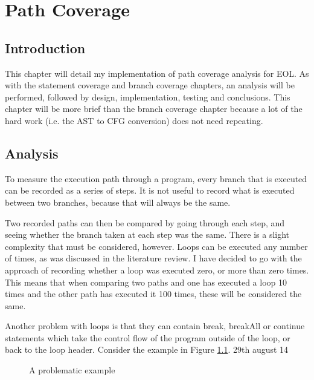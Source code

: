 \chapter{Path Coverage}

\section{Introduction}

This chapter will detail my implementation of path coverage analysis for EOL. As with the statement coverage and branch coverage chapters, an analysis will be performed, followed by design, implementation, testing and conclusions. This chapter will be more brief than the branch coverage chapter because a lot of the hard work (i.e. the AST to CFG conversion) does not need repeating.

\section{Analysis}

To measure the execution path through a program, every branch that is executed can be recorded as a series of steps. It is not useful to record what is executed between two branches, because that will always be the same. 

Two recorded paths can then be compared by going through each step, and seeing whether the branch taken at each step was the same. There is a slight complexity that must be considered, however. Loops can be executed any number of times, as was discussed in the literature review. I have decided to go with the approach of recording whether a loop was executed zero, or more than zero times. This means that when comparing two paths and one has executed a loop 10 times and the other path has executed it 100 times, these will be considered the same.

Another problem with loops is that they can contain break, breakAll or continue statements which take the control flow of the program outside of the loop, or back to the loop header. Consider the example in Figure \ref{fig:pathCoverageProblem}.
29th august 14
\begin{figure}
\centering
\begin{minipage}{.33\textwidth}
  \centering
  
\end{minipage}%
\begin{minipage}{.5\textwidth}
  \centering
\end{minipage}
\caption{A problematic example}
\label{fig:pathCoverageProblem}
\end{figure}

